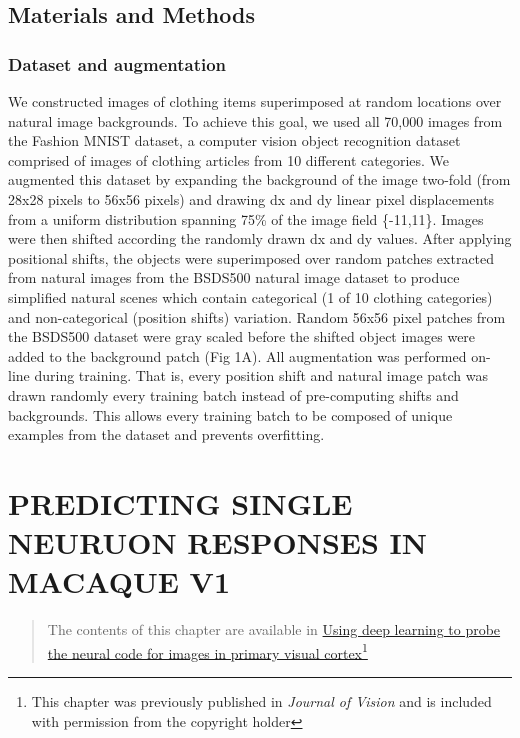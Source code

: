 \documentclass{templates/ucdenverthesis}
\begin{document}
\hypertarget{materials-and-methods}{%
\section{Materials and Methods}\label{materials-and-methods}}

\hypertarget{dataset-and-augmentation}{%
\subsection{Dataset and augmentation}\label{dataset-and-augmentation}}

We constructed images of clothing items superimposed at random locations over natural image backgrounds. To achieve this goal, we used all 70,000 images from the Fashion MNIST dataset, a computer vision object recognition dataset comprised of images of clothing articles from 10 different categories. We augmented this dataset by expanding the background of the image two-fold (from 28x28 pixels to 56x56 pixels) and drawing dx and dy linear pixel displacements from a uniform distribution spanning 75\% of the image field \{-11,11\}. Images were then shifted according the randomly drawn dx and dy values. After applying positional shifts, the objects were superimposed over random patches extracted from natural images from the BSDS500 natural image dataset to produce simplified natural scenes which contain categorical (1 of 10 clothing categories) and non-categorical (position shifts) variation. Random 56x56 pixel patches from the BSDS500 dataset were gray scaled before the shifted object images were added to the background patch (Fig 1A). All augmentation was performed on-line during training. That is, every position shift and natural image patch was drawn randomly every training batch instead of pre-computing shifts and backgrounds. This allows every training batch to be composed of unique examples from the dataset and prevents overfitting.

\hypertarget{ch5:jov}{%
\chapter{PREDICTING SINGLE NEURUON RESPONSES IN MACAQUE V1}\label{ch5:jov}}

\begin{quote}
The contents of this chapter are available in \href{https://doi.org/10.1167/19.4.29}{Using deep learning to probe the neural code for images in primary visual cortex}\footnote{This chapter was previously published in \autocite{Kindel:2019et} \emph{Journal of Vision} and is included with permission from the copyright holder}
\end{quote}
\end{document}
